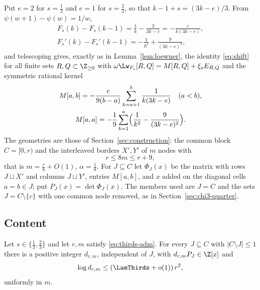 Put $e=2$ for $s=\frac13$ and $e=1$ for $s=\frac23$, so that $k-1+s=(3k-e)/3$. From $\psi(w+1)-\psi(w)=1/w$,
\[
\begin{gathered}
 F_s(k)-F_s(k-1)=\frac1k-\frac3{3k-e}=-\frac{e}{k(3k-e)},\\
 F_s'(k)-F_s'(k-1)=-\frac1{k^2}+\frac9{(3k-e)^2},
\end{gathered}
\]
and telescoping gives, exactly as in Lemma~\ref{lem:loewner}, the identity \eqref{eq:shift} for all finite sets
$R,Q\subset\Z_{\ge0}$ with $\omega\Lw_{F_s}[R,Q]=M[R,Q]+\xi_sE_{R,Q}$ and the symmetric rational kernel
\[
\begin{gathered}
 M[a,b]=-\frac{e}{9(b-a)}\sum_{k=a+1}^{b}\frac1{k(3k-e)}\quad(a<b),\\
 M[a,a]=-\frac19\sum_{k=1}^{a}\Bigl(\frac1{k^2}-\frac9{(3k-e)^2}\Bigr).
\end{gathered}
\]
The geometries are those of Section~\ref{sec:construction}: the common block $C=[0,r)$ and the interleaved borders $X',Y'$ of $m$
nodes with
\begin{equation}\label{eq:thirds-adm}
 r\le 8m\le r+9 ,
\end{equation}
that is $m=\frac r8+O(1)$, $\alpha=\frac18$. For $J\subseteq C$ let $\Phi_J(x)$ be the matrix with rows $J\sqcup X'$ and
columns $J\sqcup Y'$, entries $M[a,b]$, and $x$ added on the diagonal cells $a=b\in J$; put $P_J(x)=\det\Phi_J(x)$. The
members used are $J=C$ and the sets $J=C\setminus\{c\}$ with one common node removed, as in Section~\ref{sec:chi3-quarter}.

\subsection{Content}
\begin{theorem}[content]\label{thm:content-thirds}
Let $s\in\{\frac13,\frac23\}$ and let $r,m$ satisfy \eqref{eq:thirds-adm}. For every $J\subseteq C$ with $|C\setminus J|\le1$ there is a
positive integer $d_{r,m}$, independent of $J$, with $d_{r,m}P_J\in\Z[x]$ and
\[
 \log d_{r,m}\le(\LamThirds+o(1))\,r^2 ,
\]
uniformly in $m$.
\end{theorem}

